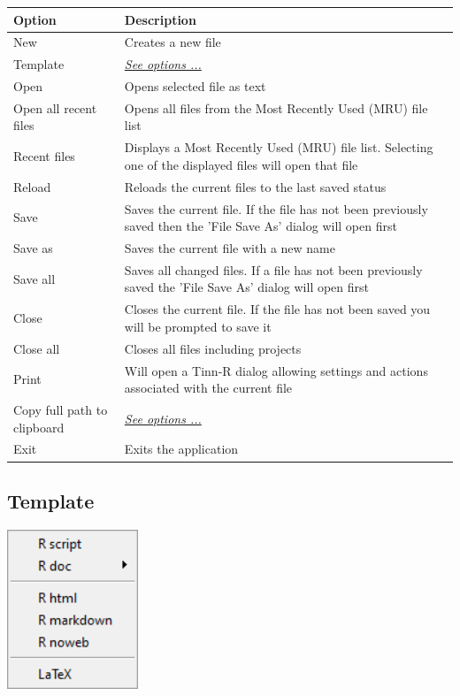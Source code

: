 \begin{scriptsize}
  \begin{tabularx}{\textwidth}{>{\hsize=0.4\hsize}X>{\hsize=0.8\hsize}X}\\
    \hline
    \textbf{Option} & \textbf{Description} \\
    \hline
    New & Creates a new file \\
    Template & \textit{\href{\#menu\_file\_template}{See options ...}} \\
    Open & Opens selected file as text \\
    Open all recent files & Opens all files from the Most Recently Used (MRU) file list \\
    Recent files & Displays a Most Recently Used (MRU) file list. Selecting one of the displayed files will open that file \\
    Reload & Reloads the current files to the last saved status \\
    Save & Saves the current file. If the file has not been previously saved then the 'File Save As' dialog will open first \\
    Save as & Saves the current file with a new name \\
    Save all & Saves all changed files. If a file has not been previously saved the 'File Save As' dialog will open first \\
    Close & Closes the current file. If the file has not been saved you will be prompted to save it \\
    Close all & Closes all files including projects \\
    Print & Will open a Tinn-R dialog allowing settings and actions associated with the current file \\
    Copy full path to clipboard & \textit{\href{\#menu\_file\_copyfullpath}{See options ...}} \\
    Exit & Exits the application \\
    \hline
  \end{tabularx}
\end{scriptsize}

\hypertarget{menu_file_template}{}
\subsection{Template}

\includegraphics[scale=0.50]{./res/menu_file_template.png}\\

